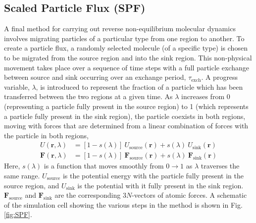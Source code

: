 \documentclass[letterpaper]{report}
\begin{document}
\subsection{\label{subsection:spf}Scaled Particle Flux (SPF)}
A final method for carrying out reverse non-equilibrium molecular
dynamics involves migrating particles of a particular type from one
region to another. To create a particle flux, a randomly selected
molecule (of a specific type) is chosen to be migrated from the source
region and into the sink region. This non-physical movement takes
place over a sequence of time steps with a full particle exchange
between source and sink occurring over an exchange period,
$\tau_\mathrm{exch}$. A progress variable, $\lambda$, is introduced to
represent the fraction of a particle which has been transferred
between the two regions at a given time. As $\lambda$ increases from 0
(representing a particle fully present in the source region) to 1
(which represents a particle fully present in the sink region), the
particle coexists in both regions, moving with forces that are
determined from a linear combination of forces with the particle in
both regions, 
\begin{eqnarray}
    U(\mathbf{r}, \lambda) & = \left[1-s(\lambda)\right] ~ U_\mathrm{source}(\mathbf{r}) + s(\lambda)~U_\mathrm{sink}(\mathbf{r}) \\ \label{eq:scalingU}
    \mathbf{F}(\mathbf{r}, \lambda) & = \left[1-s(\lambda)\right] ~ \mathbf{F}_\mathrm{source}(\mathbf{r}) + s(\lambda)~\mathbf{F}_\mathrm{sink}(\mathbf{r})
    \label{eq:scalingF}
\end{eqnarray}
Here, $s(\lambda)$ is a function that moves smoothly from $0
\rightarrow 1$ as $\lambda$ traverses the same
range. $U_\mathrm{source}$ is the potential energy with the particle
fully present in the source region, and $U_\mathrm{sink}$ is the
potential with it fully present in the sink
region. $\mathbf{F}_\mathrm{source}$  and $\mathbf{F}_\mathrm{sink}$
are the corresponding $3N$-vectors of atomic forces. A schematic of
the simulation cell showing the various steps in the method is shown
in Fig. \ref{fig:SPF}.   
\end{document}
